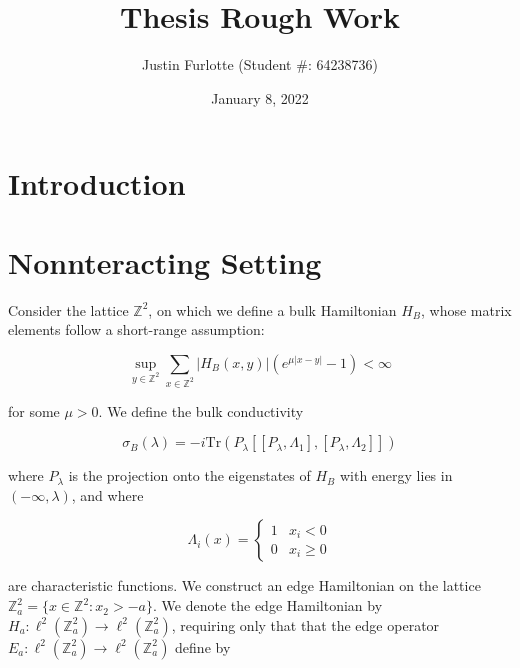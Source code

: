\documentclass[12pt, letterpaper]{article}
\title{Thesis Rough Work}
\author{Justin Furlotte (Student \#: 64238736)}
\date{January 8, 2022}
\begin{document}
\begin{titlepage}
\maketitle
\end{titlepage}

\newtheorem{theorem}{Theorem}
\newtheorem{corollary}{Corollary}
\newtheorem{lemma}{Lemma}
\newtheorem{proposition}{Proposition}
\newtheorem{assumption}{Assumption}
 
\newcommand{\C}{\mathbb{C}}
\newcommand{\Tr}{\text{Tr}}
\newcommand{\eps}{\varepsilon}
\newcommand{\R}{\mathbb{R}}
\newcommand{\N}{\mathbb{N}}
\newcommand{\Z}{\mathbb{Z}}
\newcommand{\norm}[1]{\lVert #1 \rVert}
\newcommand{\One}{\mathbbm{1}}
\newcommand{\Var}{\text{Var}}
\newcommand{\F}{\mathcal{F}}
\newcommand{\G}{\mathcal{G}}
\newcommand{\U}{\mathcal{U}}


\graphicspath{ {c:/user/justin/grad school/Thesis} }

\section{Introduction}

\section{Nonnteracting Setting}


Consider the lattice $\Z^2$, on which we define a bulk Hamiltonian $H_B$, whose matrix elements follow a short-range assumption:

\[\sup_{y\in\Z^2}\sum_{x\in\Z^2}|H_B(x,y)|(e^{\mu|x-y|}-1) < \infty\]

for some $\mu>0$. We define the bulk conductivity

\[\sigma_B(\lambda) = -i\Tr(P_\lambda[[P_\lambda,\Lambda_1],[P_\lambda,\Lambda_2]])\]

where $P_\lambda$ is the projection onto the eigenstates of $H_B$ with energy lies in $(-\infty,\lambda)$, and where 

\[\Lambda_i(x) = \begin{cases} 1 & x_i < 0\\ 0 & x_i \geq 0\end{cases}\]

are characteristic functions. We construct an edge Hamiltonian on the lattice $\Z^2_a = \{x \in \Z^2 : x_2 > -a\}$. We denote the edge Hamiltonian by $H_a:\ell^2(\Z^2_a) \to \ell^2(\Z^2_a)$, requiring only that that the edge operator $E_a:\ell^2(\Z^2_a)\to\ell^2(\Z^2_a)$ define by 
\end{document}

